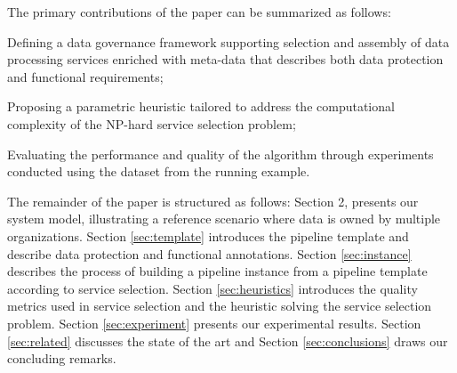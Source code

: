 The primary contributions of the paper can be summarized as follows:
\begin{enumerate*}
  \item Defining a data governance framework supporting selection and assembly of data processing services enriched with meta-data that describes both data protection and functional requirements;
  \item Proposing a parametric heuristic tailored to address the computational complexity of the NP-hard service selection problem;
  \item Evaluating the performance and quality of the algorithm through experiments conducted using the dataset from the running example.
\end{enumerate*}

The remainder of the paper is structured as follows: Section 2, presents our system model, illustrating a reference scenario where data is owned by multiple organizations. Section \ref{sec:template} introduces the pipeline template and describe data protection and functional annotations. Section \ref{sec:instance} describes the process of building a pipeline instance from a pipeline template according to service selection. Section \ref{sec:heuristics} introduces the quality metrics used in service selection and the heuristic solving the service selection problem. Section \ref{sec:experiment} presents our experimental results. Section \ref{sec:related} discusses the state of the art and Section \ref{sec:conclusions} draws our concluding remarks.